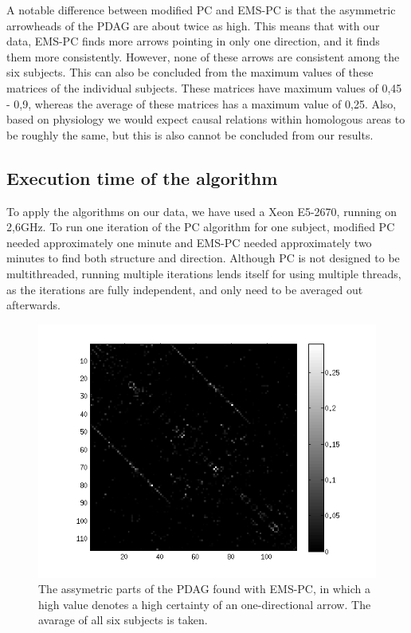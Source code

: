 \documentclass[a4paper, 10pt, english, onecolumn]{article}
\begin{document}
A notable difference between modified PC and EMS-PC is that the asymmetric arrowheads of the PDAG are about twice as high. %
This means that with our data, EMS-PC finds more arrows pointing in only one direction, and it finds them more consistently.
However, none of these arrows are consistent among the six subjects.
This can also be concluded from the maximum values of these matrices of the individual subjects.
These matrices have maximum values of 0,45 - 0,9, whereas the average of these matrices has a maximum value of 0,25.
Also, based on physiology we would expect causal relations within homologous areas to be roughly the same, but this is also cannot be concluded from our results.

\subsection{Execution time of the algorithm}
To apply the algorithms on our data, we have used a Xeon E5-2670, running on 2,6GHz.
To run one iteration of the PC algorithm for one subject, modified PC needed approximately one minute and EMS-PC needed approximately two minutes to find both structure and direction.
Although PC is not designed to be multithreaded, running multiple iterations lends itself for using multiple threads, as the iterations are fully independent, and only need to be averaged out afterwards.

\begin{figure}[h!]
  \centering
  \includegraphics{images/PDAG_avg_antisymmetric_expl}
  \caption{The assymetric parts of the PDAG found with EMS-PC, in which a high value denotes a high certainty of an one-directional arrow. The avarage of all six subjects is taken.}
  \label{fig:pdag_avg_antisymmetric_ems}
\end{figure}
\end{document}
